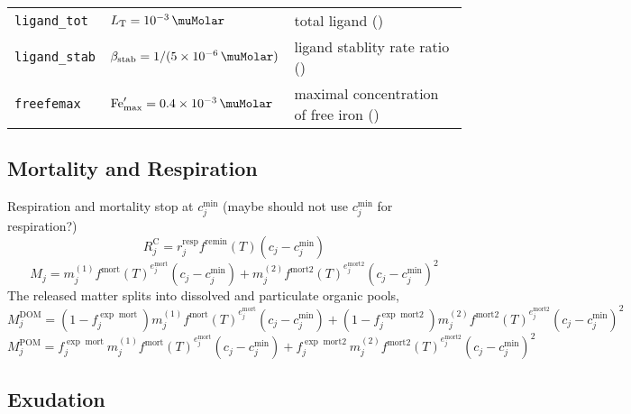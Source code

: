\documentclass[11pt,letterpaper,english]{article}
\renewcommand{\ll}[1]{{\tt #1}}
\def\|#1|{\operatorname{#1}}
\def\tempMort{e^{\|mort|}_j}
\def\tempMortTWO{e^{\|mort2|}_j}
\DeclareMathOperator{\Fe}{Fe}
\DeclareMathOperator{\DOM}{DOM}
\DeclareMathOperator{\POM}{POM}
\newcommand{\C}{\mathrm{C}}
\let\unit=\si
\renewcommand{\si}{\mathrm{si}}
\newcommand{\total}{{\mathrm{T}}}
\newcommand{\FeT}{\Fe_\total}
\newcommand{\Ltot}{L_\total}
\newcommand{\stab}{\text{stab}}
\newcommand{\Lstab}{\beta_{\stab}}
\newcommand{\resp}{{\text{resp}}}
\newcommand{\scav}{{\text{scav}}}
\newcommand{\remin}{{\text{remin}}}
\newcommand{\X}{c}
\begin{document}

%

\begin{tabular}{@{}l@{\qquad}l@{${}={}$}l}
\ll{ligand\_tot}  & $\Ltot=\SI{e-3}{\muMolar}$
                  & total ligand (\unit{\muMolar})  \\
\ll{ligand\_stab} & $\Lstab=1/(\SI{5E-6}{\muMolar})$
                  & ligand stablity rate ratio (\unit{\meter\cubed\per\milli\mol}) \\
\ll{freefemax}    & $\Fe'_{\max}=\SI{0.4E-3}{\muMolar}$
                  & maximal concentration of free iron (\unit{\milli\mol\per\meter\cubed})
\end{tabular}






\subsection{Mortality and Respiration}

Respiration and mortality stop at $\X_j^{\min}$
(maybe should not use $\X_j^{\min}$ for respiration?)
\[
  R^\C_j = r^\resp_j f^\remin(T) (\X_j - \X_j^{\min})
\]
\[
  M_j = m^{(1)}_j {f^{\|mort|}(T)}^{\tempMort} (\X_j - \X_j^{\min})
      + m^{(2)}_j {f^{\|mort2|}(T)}^{\tempMortTWO} (\X_j - \X_j^{\min})^2
\]
The released matter splits into dissolved and particulate organic pools,
\[
  M^{\DOM}_j = (1 - f_j^{\exp\|mort|}) m^{(1)}_j {f^{\|mort|}(T)}^{\tempMort} (\X_j - \X_j^{\min})
            + (1 - f_j^{\exp\|mort2|}) m^{(2)}_j {f^{\|mort2|}(T)}^{\tempMortTWO} (\X_j - \X_j^{\min})^2
\]
\[
  M^{\POM}_j = f_j^{\exp\|mort|} m^{(1)}_j {f^{\|mort|}(T)}^{\tempMort} (\X_j - \X_j^{\min})
            + f_j^{\exp\|mort2|} m^{(2)}_j {f^{\|mort2|}(T)}^{\tempMortTWO} (\X_j - \X_j^{\min})^2
\]



\subsection{Exudation}
\end{document}
